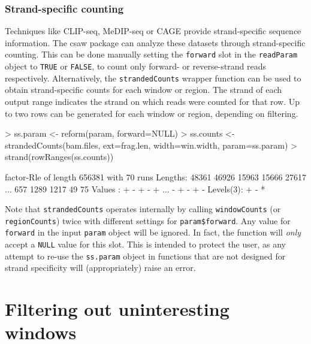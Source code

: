 \documentclass[12pt]{report}
\renewenvironment{Schunk}{\vspace{0pt}}{\vspace{0pt}}
\newcommand{\pkgname}{csaw}
\newcommand{\code}[1]{{\small\texttt{#1}}}
\begin{document}
\subsection{Strand-specific counting}
Techniques like CLIP-seq, MeDIP-seq or CAGE provide strand-specific sequence information.
The \pkgname{} package can analyze these datasets through strand-specific counting.
This can be done manually setting the \code{forward} slot in the \code{readParam} object to \code{TRUE} or \code{FALSE}, to count only forward- or reverse-strand reads respectively.
Alternatively, the \code{strandedCounts} wrapper function can be used to obtain strand-specific counts for each window or region.
The strand of each output range indicates the strand on which reads were counted for that row.
Up to two rows can be generated for each window or region, depending on filtering.

\begin{Schunk}
\begin{Sinput}
> ss.param <- reform(param, forward=NULL)
> ss.counts <- strandedCounts(bam.files, ext=frag.len, width=win.width, param=ss.param)
> strand(rowRanges(ss.counts))
\end{Sinput}
\begin{Soutput}
factor-Rle of length 656381 with 70 runs
  Lengths: 48361 46926 15963 15666 27617 ...   657  1289  1217    49    75
  Values :     +     -     +     -     + ...     -     +     -     +     -
Levels(3): + - *
\end{Soutput}
\end{Schunk}

Note that \code{strandedCounts} operates internally by calling \code{windowCounts} (or \code{regionCounts}) twice with different settings for \code{param\$forward}. 
Any value for \code{forward} in the input \code{param} object will be ignored.
In fact, the function will \textit{only} accept a \code{NULL} value for this slot.
This is intended to protect the user, as any attempt to re-use the \code{ss.param} object in functions that are not designed for strand specificity will (appropriately) raise an error.



\chapter{Filtering out uninteresting windows}
\label{chap:filter}
\end{document}
